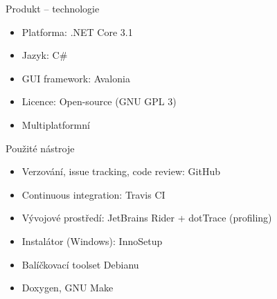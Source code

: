 \documentclass[10pt,xcolor=pdflatex,hyperref={unicode,hidelinks}]{beamer}
\begin{document}
\begin{frame}{Produkt -- technologie}
    \begin{itemize}
        \item Platforma: .NET Core 3.1
        \item Jazyk: C\#
        \item GUI framework: Avalonia
        \item Licence: Open-source (GNU GPL 3)
        \item Multiplatformní
    \end{itemize}
\end{frame}

\begin{frame}{Použité nástroje}
    \begin{itemize}
        \item Verzování, issue tracking, code review: GitHub
        \item Continuous integration: Travis CI
        \item Vývojové prostředí: JetBrains Rider + dotTrace (profiling)
        \item Instalátor (Windows): InnoSetup
        \item Balíčkovací toolset Debianu
        \item Doxygen, GNU Make
    \end{itemize}
\end{frame}
\end{document}
